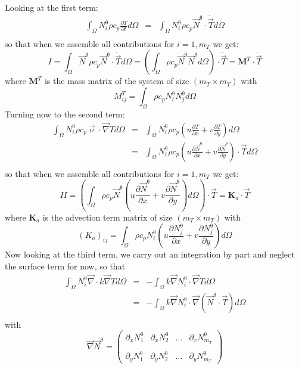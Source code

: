 Looking at the first term:
\begin{eqnarray}
\int_\Omega N^\uptheta_i  \rho c_p \frac{\partial T}{\partial t} d\Omega
&=&  \int_\Omega N^\uptheta_i  \rho c_p \vec N^\uptheta \cdot \dot{\vec T}  d\Omega \\
\end{eqnarray}
so that when we assemble all contributions for $i=1,m_T$ we get:
\[
I 
= \int_\Omega \vec N^\uptheta  \rho c_p \vec N^\uptheta \cdot \dot{\vec T}  d\Omega
= \left( \int_\Omega \rho c_p  \vec N^\uptheta  \vec N^\uptheta  d\Omega \right) \cdot \dot{\vec T}
= {\bm M}^T \cdot \dot{\vec T}
 \]
where ${\bm M}^T$ is the mass matrix of the system of size $(m_T \times m_T)$ with 
\[
M_{ij}^T = \int_\Omega \rho c_p N_i^\uptheta N_j^\uptheta d\Omega
\]
Turning now to the second term:
\begin{eqnarray}
\int_\Omega N^\uptheta_i  \rho c_p  {\vec \upnu}\cdot {\vec\nabla T}   d\Omega
&=& \int_\Omega N^\uptheta_i  \rho c_p (u \frac{\partial T}{\partial x} +  v \frac{\partial T}{\partial y} ) d\Omega \\
&=& \int_\Omega N^\uptheta_i  \rho c_p (u \frac{\partial \vec N^\uptheta}{\partial x} +  v \frac{\partial \vec N^\uptheta}{\partial y} ) \cdot \vec T d\Omega \\
\end{eqnarray}
so that when we assemble all contributions for $i=1,m_T$ we get:
\[
II = \left(\int_\Omega \rho c_p \vec N^\uptheta (u \frac{\partial \vec N^\uptheta}{\partial x} +  v \frac{\partial \vec N^\uptheta}{\partial y} ) d\Omega \right)  \cdot \vec T = {\bm K}_a \cdot \vec T
\]
where ${\bm K}_a$ is the advection term matrix of size $(m_T \times m_T)$ with
\[
(K_a)_{ij} = \int_\Omega \rho c_p N_i^\uptheta 
\left(u \frac{\partial N_j^\uptheta}{\partial x} +  v \frac{\partial N_j^\uptheta}{\partial y} \right) d\Omega 
\]
Now looking at the third term, we carry out an integration by part and neglect the surface term for now, so that 
\begin{eqnarray}
\int_\Omega  N^\uptheta_i {\vec \nabla} \cdot k \vec\nabla T d\Omega
&=& - \int_\Omega  k \vec \nabla N^\uptheta_i \cdot \vec\nabla T d\Omega \\
&=& - \int_\Omega  k \vec \nabla N^\uptheta_i \cdot \vec\nabla (\vec N^\uptheta \cdot \vec T) d\Omega \\
\end{eqnarray}
with 
\[
\vec \nabla \vec N^\uptheta = 
\left(
\begin{array}{cccc}
\partial_x N_1^\uptheta & 
\partial_x N_2^\uptheta & \dots &
\partial_x N_{m_T}^\uptheta \\ \\
\partial_y N_1^\uptheta & 
\partial_y N_2^\uptheta & \dots &
\partial_y N_{m_T}^\uptheta 
\end{array}
\right)
\]
